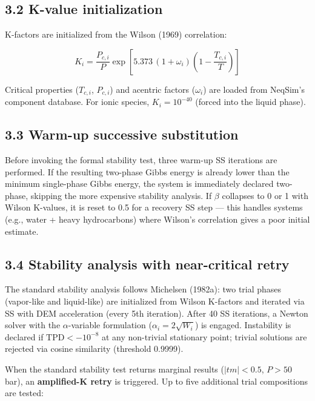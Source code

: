 \documentclass[review,3p]{custom}
\begin{document}
\subsection{3.2 K-value initialization}

K-factors are initialized from the Wilson (1969) correlation:

\begin{equation}

K_i = \frac{P_{c,i}}{P} \exp\!\left[5.373\,(1 + \omega_i)\!\left(1 - \frac{T_{c,i}}{T}\right)\right]

\end{equation}

Critical properties ($T_{c,i}$, $P_{c,i}$) and acentric factors ($\omega_i$) are
loaded from NeqSim's component database. For ionic species, $K_i = 10^{-40}$
(forced into the liquid phase).

\subsection{3.3 Warm-up successive substitution}

Before invoking the formal stability test, three warm-up SS iterations are performed.
If the resulting two-phase Gibbs energy is already lower than the minimum
single-phase Gibbs energy, the system is immediately declared two-phase, skipping
the more expensive stability analysis. If $\beta$ collapses to 0 or 1 with
Wilson K-values, it is reset to 0.5 for a recovery SS step — this handles
systems (e.g., water + heavy hydrocarbons) where Wilson's correlation gives
a poor initial estimate.

\subsection{3.4 Stability analysis with near-critical retry}

The standard stability analysis follows Michelsen (1982a): two trial phases
(vapor-like and liquid-like) are initialized from Wilson K-factors and iterated
via SS with DEM acceleration (every 5th iteration). After 40 SS iterations, a
Newton solver with the $\alpha$-variable formulation ($\alpha_i = 2\sqrt{W_i}$)
is engaged. Instability is declared if $\text{TPD} < -10^{-8}$ at any non-trivial
stationary point; trivial solutions are rejected via cosine similarity (threshold 0.9999).

When the standard stability test returns marginal results ($|tm| < 0.5$, $P > 50$ bar),
an \textbf{amplified-K retry} is triggered. Up to five additional trial compositions are tested:
\end{document}
